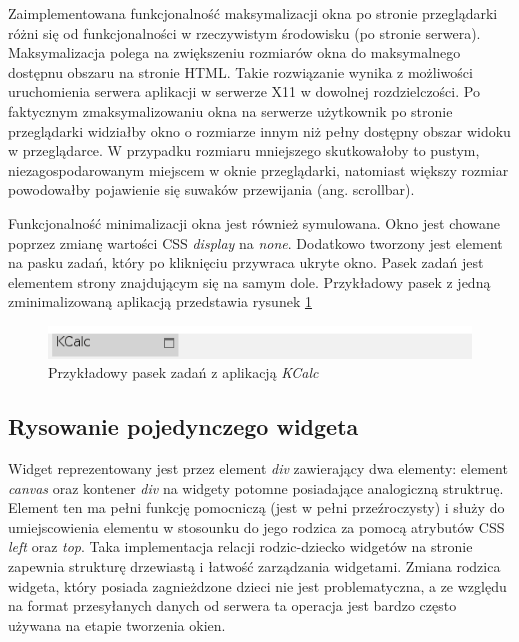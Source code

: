 Zaimplementowana funkcjonalność maksymalizacji okna po stronie przeglądarki różni się od funkcjonalności w rzeczywistym środowisku (po stronie serwera). Maksymalizacja polega na zwiększeniu rozmiarów okna do maksymalnego dostępnu obszaru na stronie HTML.
Takie rozwiązanie wynika z możliwości uruchomienia serwera aplikacji w serwerze X11 w dowolnej rozdzielczości. Po faktycznym zmaksymalizowaniu okna na serwerze użytkownik po stronie przeglądarki widziałby okno o rozmiarze innym niż pełny dostępny obszar widoku w przeglądarce. W przypadku rozmiaru mniejszego skutkowałoby to pustym, niezagospodarowanym miejscem w oknie przeglądarki, natomiast większy rozmiar powodowałby pojawienie się suwaków przewijania (ang. scrollbar).

Funkcjonalność minimalizacji okna jest również symulowana. Okno jest chowane poprzez zmianę wartości CSS \emph{display} na \emph{none}. Dodatkowo tworzony jest element na pasku zadań, który po kliknięciu przywraca ukryte okno. Pasek zadań jest elementem strony znajdującym się na samym dole. Przykładowy pasek z jedną zminimalizowaną aplikacją przedstawia rysunek \ref{fig:taskbar}

\begin{figure}
\centering
\includegraphics[width=0.7\linewidth]{img/taskbar}
\caption{Przykładowy pasek zadań z aplikacją \emph{KCalc}}
\label{fig:taskbar}
\end{figure}


\subsection{Rysowanie pojedynczego widgeta}

Widget reprezentowany jest przez element \emph{div} zawierający dwa elementy: element \emph{canvas} oraz kontener \emph{div} na widgety potomne posiadające analogiczną struktruę. Element ten ma pełni funkcję pomocniczą (jest w pełni przeźroczysty) i służy do umiejscowienia elementu w stosounku do jego rodzica za pomocą atrybutów CSS \emph{left} oraz \emph{top}. Taka implementacja relacji rodzic-dziecko widgetów na stronie zapewnia strukturę drzewiastą i łatwość zarządzania widgetami. Zmiana rodzica widgeta, który posiada zagnieżdzone dzieci nie jest problematyczna, a ze względu na format przesyłanych danych od serwera ta operacja jest bardzo często używana na etapie tworzenia okien.

